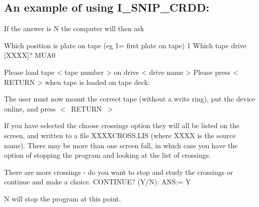 \documentclass[nolof,noabs,11pt]{starlink}
\begin{document}
\subsection {An example of using I\_SNIP\_CRDD:}

\vspace {3mm}
If the answer is N the computer will then ask

\begin{terminalv}
    Which position is plate on tape (eg 1= first plate on tape)
    1
    Which tape drive [XXXX]?
    MUA0

    Please load tape < tape number > on drive < drive name >
    Please press < RETURN > when tape is loaded on tape deck:
\end{terminalv}

The user must now mount the correct tape (without a write ring), put
the device online, and press $<$~RETURN~$>$

\begin{terminalv}
\end{terminalv}
If you have selected the choose crossings option they will all be listed
on the screen, and written to a file XXXXCROSS.LIS (where XXXX is the source
name).  There may be more than one screen full, in which case you have
the option of stopping the program and looking at the list of crossings.

\begin{terminalv}
    There are more crossings - do you want to stop and study
    the crossings or continue and make a choice.
    CONTINUE? (Y/N):
    ANS:= Y
\end{terminalv}
N will stop the program at this point.
\end{document}
